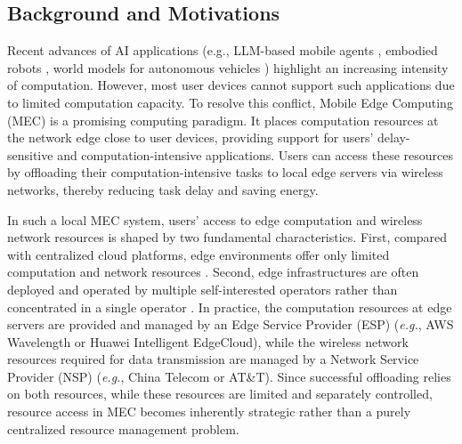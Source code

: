 \documentclass[lettersize,journal]{IEEEtran}
\newcommand{\eg}{\emph{e.g.}}
\begin{document}
\subsection{Background and Motivations}
Recent advances of AI applications (e.g., LLM-based mobile agents \cite{wang2024mobile,wen2024autodroid}, embodied robots \cite{DeepMind_Gemini_Robotics_OnDevice,zitkovich2023rt}, world models for autonomous vehicles \cite{zhao2025drivedreamer,wang2024drivedreamer}) highlight an increasing intensity of computation. However, most user devices cannot support such applications due to limited computation capacity. To resolve this conflict, Mobile Edge Computing (MEC) \cite{chen2015efficient,abbas2017mobile} is a promising computing paradigm. It places computation resources at the network edge close to user devices, providing support for users' delay-sensitive and computation-intensive applications. Users can access these resources by offloading their computation-intensive tasks to local edge servers via wireless networks, thereby reducing task delay and saving energy.

In such a local MEC system, users' access to edge computation and wireless network resources is shaped by two fundamental characteristics. First, compared with centralized cloud platforms, edge environments offer only limited computation and network resources \cite{wang2023decentralized,liao2026cooperative}. Second, edge infrastructures are often deployed and operated by multiple self-interested operators rather than concentrated in a single operator \cite{chen2024price,liu2022resource,liao2026cooperative}. In practice, the computation resources at edge servers are provided and managed by an Edge Service Provider (ESP) (\eg, AWS Wavelength or Huawei Intelligent EdgeCloud), while the wireless network resources required for data transmission are managed by a Network Service Provider (NSP) (\eg, China Telecom or AT\&T). Since successful offloading relies on both resources, while these resources are limited and separately controlled, resource access in MEC becomes inherently strategic rather than a purely centralized resource management problem.
\end{document}
